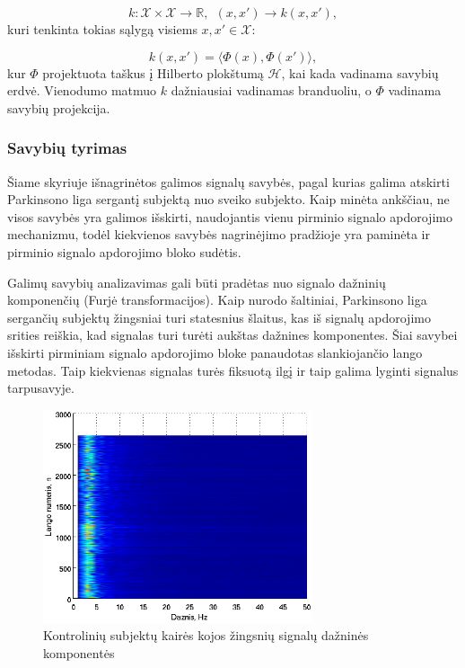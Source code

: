 \documentclass[]{vgtuef}
\begin{document}
\begin{equation}
  k: \mathcal{X} \times \mathcal{X} \rightarrow \mathbb{R}, ~~ (x,x')
  \rightarrow k(x,x'),
\end{equation}
kuri tenkinta tokias sąlygą visiems $x,x' \in \mathcal{X}$:

\begin{equation}
  k(x,x') = \langle \Phi(x), \Phi(x') \rangle,
\end{equation}
kur $\Phi$ projektuota taškus į Hilberto plokštumą $\mathcal{H}$, kai kada vadinama savybių erdvė. Vienodumo matmuo $k$ dažniausiai vadinamas branduoliu, o $\Phi$ vadinama savybių projekcija.

\subsubsection{Savybių tyrimas}

Šiame skyriuje išnagrinėtos galimos signalų savybės, pagal kurias galima atskirti Parkinsono liga sergantį subjektą nuo sveiko subjekto. Kaip minėta ankščiau, ne visos savybės yra galimos išskirti, naudojantis vienu pirminio signalo apdorojimo mechanizmu, todėl kiekvienos savybės nagrinėjimo pradžioje yra paminėta ir pirminio signalo apdorojimo bloko sudėtis.


Galimų savybių analizavimas gali būti pradėtas nuo signalo dažninių komponenčių (Furjė transformacijos). Kaip nurodo šaltiniai,  Parkinsono liga sergančių subjektų žingsniai turi statesnius šlaitus, kas iš signalų apdorojimo srities reiškia, kad signalas turi turėti aukštas dažnines komponentes. Šiai savybei išskirti pirminiam signalo apdorojimo bloke panaudotas slankiojančio lango metodas. Taip kiekvienas signalas turės fiksuotą ilgį ir taip galima lyginti signalus tarpusavyje.

\begin{figure}[!t]
  \centering
  \includegraphics[width=300px]{figures/co_fft.eps}
  \caption{Kontrolinių subjektų kairės kojos žingsnių signalų dažninės komponentės}
  \label{fig:co_fft}
\end{figure}
\end{document}
